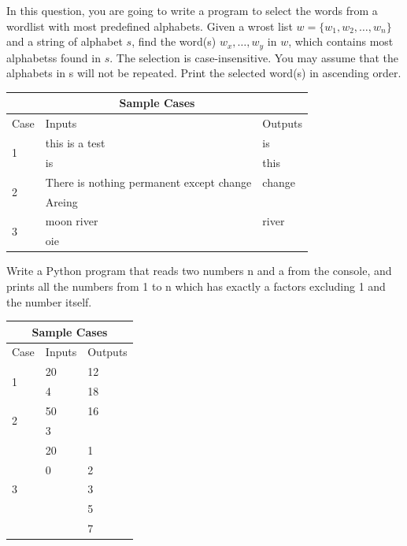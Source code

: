 \documentclass{exam}
\begin{document}
\begin{questions}
    \marksnotpoints 
    \question[15] In this question, you are going to write a program to select the words from a wordlist with most predefined alphabets. Given a wrost list $w = \{w_1, w_2, \ldots , w_n\}$ and a string of alphabet $s$, find the word(s) $w_x, \ldots, w_y$ in $w$, which contains most alphabetss found in $s$. The selection is case-insensitive. You may assume that the alphabets in s will not be repeated. Print the selected word(s) in ascending order. \\
    \begin{center}
    \begin{tabular}{ |p{1cm}||p{11cm}|p{2cm}|  }
    \hline
    \multicolumn{3}{|c|}{Sample Cases} \\
    \hline
    Case& Inputs & Outputs\\
    \hline
    \multirow{2}{4em}{1} & this is a test & is \\ 
& is & this \\ 
    \hline
    \multirow{2}{4em}{2} & There is nothing permanent except change & change \\
& Areing & \\
    \hline
    \multirow{2}{4em}{3} & moon river & river \\
& oie & \\
    \hline
    \end{tabular}
    \end{center}

    \question[15] Write a Python program that reads two numbers n and a from the console, and prints all the numbers from 1 to n which has exactly a factors excluding 1 and the number itself.
    \begin{center}
    \begin{tabular}{ |p{1cm}||p{11cm}|p{2cm}|  }
    \hline
    \multicolumn{3}{|c|}{Sample Cases} \\
    \hline
    Case& Inputs & Outputs\\
    \hline
    \multirow{2}{4em}{1} & 20 & 12 \\ 
& 4 & 18 \\ 
    \hline
    \multirow{2}{4em}{2} & 50 & 16 \\
& 3 & \\
    \hline
    \multirow{5}{4em}{3} & 20 & 1 \\
& 0 & 2\\
& & 3\\
& & 5\\
& & 7\\
    \hline
    \end{tabular}
    \end{center}
    

\end{questions}
\end{document}
